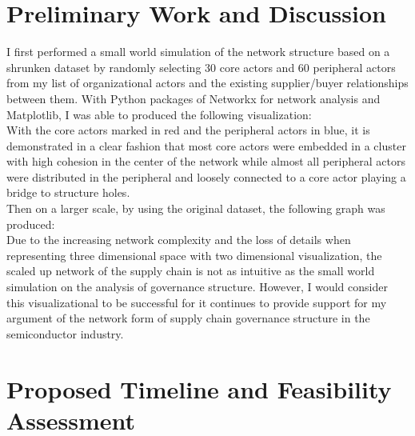 \documentclass[12pt]{article}
\begin{document}
\section*{\centering Preliminary Work and Discussion}
\textbf{}
\indent I first performed a small world simulation of the network structure based on a shrunken dataset by randomly selecting 30 core actors and 60 peripheral actors from my list of organizational actors and the existing supplier/buyer relationships between them. With Python packages of Networkx for network analysis and Matplotlib, I was able to produced the following visualization: \\
\indent With the core actors marked in red and the peripheral actors in blue, it is demonstrated in a clear fashion that most core actors were embedded in a cluster with high cohesion in the center of the network while almost all peripheral actors were distributed in the peripheral and loosely connected to a core actor playing a bridge to structure holes. \\
\indent Then on a larger scale, by using the original dataset, the following graph was produced: \\
\indent Due to the increasing network complexity and the loss of details when representing three dimensional space with two dimensional visualization, the scaled up network of the supply chain is not as intuitive as the small world simulation on the analysis of governance structure. However, I would consider this visualizational to be successful for it continues to provide support for my argument of the network form of supply chain governance structure in the semiconductor industry. \\

\section{\centering Proposed Timeline and Feasibility Assessment}
\textbf{
\indent
}
\end{document}

